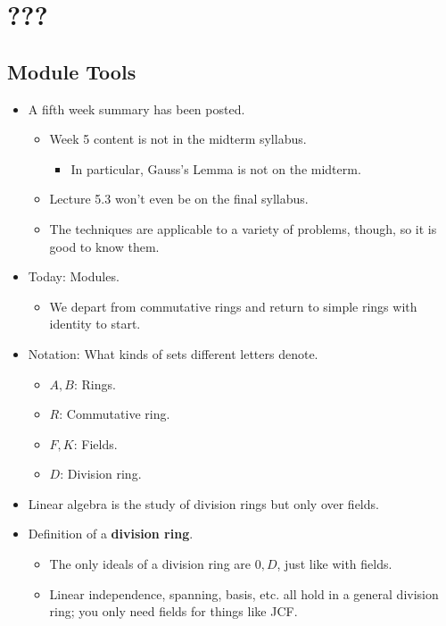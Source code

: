\documentclass[../notes.tex]{subfiles}
\begin{document}
\chapter{???}
\section{Module Tools}
\begin{itemize}
    \item {}A fifth week summary has been posted.
    \begin{itemize}
        \item Week 5 content is not in the midterm syllabus.
        \begin{itemize}
            \item In particular, Gauss's Lemma is not on the midterm.
        \end{itemize}
        \item Lecture 5.3 won't even be on the final syllabus.
        \item The techniques are applicable to a variety of problems, though, so it is good to know them.
    \end{itemize}
    \item Today: Modules.
    \begin{itemize}
        \item We depart from commutative rings and return to simple rings with identity to start.
    \end{itemize}
    \item Notation: What kinds of sets different letters denote.
    \begin{itemize}
        \item $A,B$: Rings.
        \item $R$: Commutative ring.
        \item $F,K$: Fields.
        \item $D$: Division ring.
    \end{itemize}
    \item Linear algebra is the study of division rings but only over fields.
    \item Definition of a \textbf{division ring}.
    \begin{itemize}
        \item The only ideals of a division ring are $0,D$, just like with fields.
        \item Linear independence, spanning, basis, etc. all hold in a general division ring; you only need fields for things like JCF.

\end{itemize}
\end{itemize}
\end{document}
